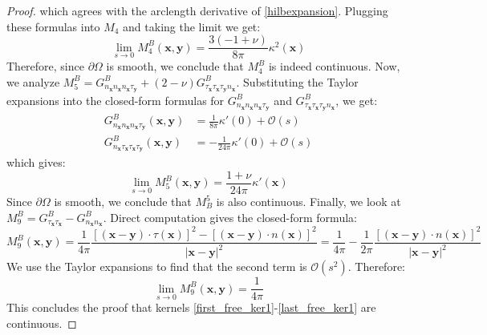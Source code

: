 \documentclass[preprint,12pt,3p]{elsarticle}
\begin{document}
\begin{proof}
    which agrees with the arclength derivative of \eqref{hilbexpansion}. Plugging these formulas into $M_4$ and taking the limit we get:
    \begin{equation}
        \lim_{s\to 0} M^{B}_4(\mathbf{x},\mathbf{y}) = \frac{3(-1+\nu)}{8\pi} \kappa^2(\mathbf{x}) 
    \end{equation}
    Therefore, since $\partial \Omega $ is smooth, we conclude that $M^{B}_{4}$ is indeed continuous. Now, we analyze $M^{B}_{5} = G^{B}_{n_\mathbf{x} n_\mathbf{x} n_\mathbf{x}\tau_\mathbf{y} } + (2-\nu) G^{B}_{\tau_\mathbf{x} \tau_\mathbf{x} \tau_\mathbf{y} n_\mathbf{x}}$. Substituting the Taylor expansions into the closed-form formulas for $G^{B}_{n_\mathbf{x} n_\mathbf{x} n_\mathbf{x}\tau_\mathbf{y} }$ and $G^{B}_{\tau_\mathbf{x} \tau_\mathbf{x} \tau_\mathbf{y} n_\mathbf{x}}$, we get: 
    \begin{align}
        G^{B}_{n_\mathbf{x} n_\mathbf{x} n_\mathbf{x}\tau_\mathbf{y} } (\mathbf{x},\mathbf{y}) &= \frac{1}{8 \pi} \kappa'(0) + \mathcal{O}(s)\\
        G^{B}_{n_\mathbf{x}\tau_\mathbf{x} \tau_\mathbf{x} \tau_\mathbf{y} }(\mathbf{x},\mathbf{y}) &= -\frac{1}{24\pi}\kappa'(0) +  \mathcal{O}(s)
    \end{align}
    which gives:
    \begin{equation}
        \lim_{s\to 0} M^B_5(\mathbf{x},\mathbf{y}) =  \frac{1+\nu}{24\pi}\kappa'(\mathbf{x})
    \end{equation}
     Since $\partial \Omega $ is smooth, we conclude that $M_{B}^{5}$ is also continuous. Finally, we look at $M^{B}_{9} =  G^{B}_{\tau_\mathbf{x} \tau_\mathbf{x}} -  G^{B}_{n_\mathbf{x} n_\mathbf{x}}$. Direct computation gives the closed-form formula: 
     \begin{equation}
         M^{B}_{9}(\mathbf{x},\mathbf{y}) = \frac{1}{4\pi} \frac{[(\mathbf{x}-\mathbf{y}) \cdot \tau(\mathbf{x})]^2 -[(\mathbf{x}-\mathbf{y}) \cdot  n(\mathbf{x}) ]^2 }{|\mathbf{x}-\mathbf{y}|^2} = \frac{1}{4\pi} - \frac{1}{2\pi} \frac{[(\mathbf{x}-\mathbf{y}) \cdot  n(\mathbf{x}) ]^2}{|\mathbf{x}-\mathbf{y}|^2}
     \end{equation}
     We use the Taylor expansions to find that the second term is $\mathcal{O}(s^2)$. Therefore: 
     \begin{equation}
         \lim_{s\rightarrow 0} M^{B}_{9}(\mathbf{x},\mathbf{y}) = \frac{1}{4\pi}
     \end{equation}
     This concludes the proof that kernels \eqref{first_free_ker1}-\eqref{last_free_ker1} are continuous.
\end{proof}
\end{document}
